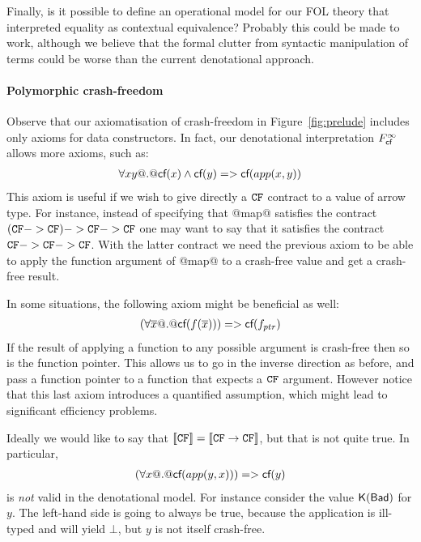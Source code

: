Finally, is it possible to define an operational model for our FOL theory that interpreted
equality as contextual equivalence? Probably this could be made to work, although we believe
that the formal clutter from syntactic manipulation of terms could be worse than the current
denotational approach. 


\paragraph{Polymorphic crash-freedom}

Observe that our axiomatisation of crash-freedom in Figure~\ref{fig:prelude} 
includes only axioms for data constructors. In fact, our denotational interpretation
$F_{\textsf{cf}}^{\infty}$ allows more axioms, such as:
\[\begin{array}{l}
    \forall x y @.@ \textsf{cf}(x) \land \textsf{cf}(y) => \textsf{cf}(app(x,y))
\end{array}\] 
This axiom is useful if we wish to give directly a ${\tt CF}$ contract to a value of 
arrow type. For instance, instead of specifying that @map@ satisfies the contract
$({\tt CF} -> {\tt CF}) -> {\tt CF} -> {\tt CF}$ one may want to say that it satisfies the contract
${\tt CF} -> {\tt CF} -> {\tt CF}$. With the latter contract we need the previous axiom to be 
able to apply the function argument of @map@ to a crash-free value and get a 
crash-free result. 

In some situations, the following axiom might be beneficial as well:
\[\begin{array}{l}
    (\forall \overline{x} @.@ \textsf{cf}(f(\overline{x}))) => \textsf{cf}(f_{ptr})
\end{array}\]
If the result of applying a function to any possible argument is crash-free then 
so is the function pointer. This allows us to go in the inverse direction as before, 
and pass a function pointer to a function that expects a ${\tt CF}$ argument. However notice
that this last axiom introduces a quantified assumption, which might lead to significant
efficiency problems.

Ideally we would like to say that $[\![{\tt CF}]\!] = [\![{\tt CF} \rightarrow {\tt CF}]\!]$,
but that is not quite true.  In particular, 
\[\begin{array}{l}
   (\forall x @.@ \textsf{cf}(app(y,x))) => \textsf{cf}(y)
\end{array}\]
is {\em not} valid in the denotational model. For instance consider the
value $\mathsf{K}(\mathsf{Bad})$ for $y$. The left-hand side is going to always 
be true, because the application is ill-typed and will yield $\bot$, but $y$ 
is not itself crash-free.


